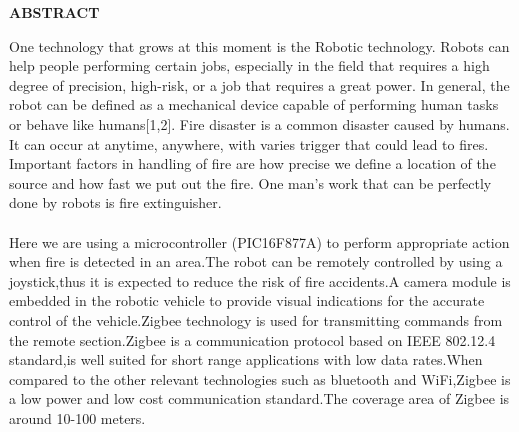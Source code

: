 \documentclass[12pt,a4paper]{report}
\begin{document}
\newpage
\begin{verbatim}
\end{verbatim}
\begin{center}
{\bf{ABSTRACT}}
\end{center}
\vspace{30pt}
\begin{doublespace}
\hspace*{1cm}One technology that grows at this moment is the Robotic technology. Robots can help people performing certain jobs, especially in the field that requires a high degree of precision, high-risk, or a job that requires a great power. In general, the robot can be defined as a mechanical device capable of performing human tasks or behave like humans[1,2]. Fire disaster is a common disaster caused by humans. It can occur at anytime, anywhere, with varies trigger that could lead to fires. Important factors in handling of fire are how precise we define a location of the source and how fast we put out the fire. One man's work that can be perfectly done by robots is fire extinguisher.\\\\ 
 \hspace*{1cm} 
Here we are using a microcontroller (PIC16F877A) to perform appropriate action when fire is detected in an area.The robot can be remotely controlled by using a joystick,thus it is expected to reduce the risk of fire accidents.A camera module is embedded in the robotic vehicle to provide visual indications for the accurate control of the vehicle.Zigbee technology is used for transmitting commands from the remote section.Zigbee is a communication protocol based on IEEE 802.12.4 standard,is well suited for short range applications with low data rates.When compared to the other relevant technologies such as bluetooth and WiFi,Zigbee is a low power and low cost communication standard.The coverage area of Zigbee is around 10-100 meters.    \\\\         

\end{doublespace}


\newpage
{
%
}
\tableofcontents
{}
\listoffigures
{}
\end{document}
